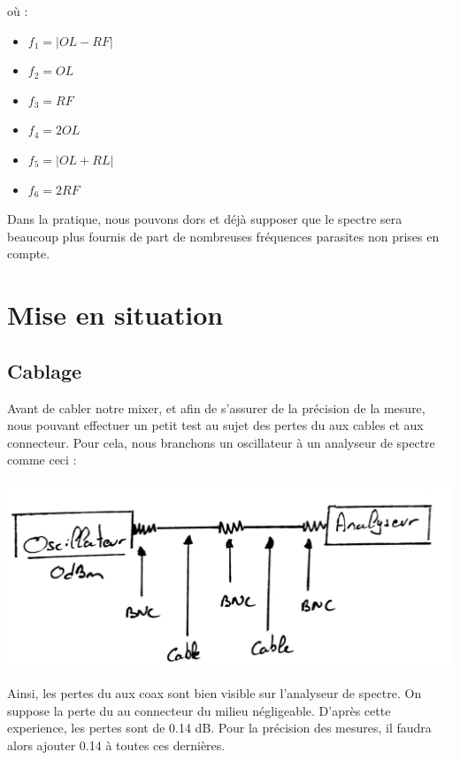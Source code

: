\documentclass[a4paper,12pt]{report}            %
\begin{document}
où : 
\begin{itemize}
    \item $f_{1} = |OL-RF|$
    \item $f_{2} = OL$ 
    \item $f_{3} = RF$
    \item $f_{4} = 2OL$
    \item $f_{5} = |OL+RL|$
    \item $f_{6} = 2RF$
\end{itemize}


\bigskip
Dans la pratique, nous pouvons dors et déjà supposer que le spectre sera beaucoup
plus fournis de part de nombreuses fréquences parasites non prises en compte.

\chapter{Mise en situation}
\section{Cablage}

Avant de cabler notre mixer, et afin de s'assurer de la précision de la mesure, 
nous pouvant effectuer un petit test au sujet des pertes du aux cables et aux connecteur.
Pour cela, nous branchons un oscillateur à un analyseur de spectre comme ceci :\\
\begin{center}\includegraphics[scale = 0.2]{pic/mesure_perte.png}\\ \end{center}

    Ainsi, les pertes du aux coax sont bien visible sur l'analyseur de spectre. On suppose
la perte du au connecteur du milieu négligeable. D'après cette experience, les pertes sont de
0.14 dB. Pour la précision des mesures, il faudra alors ajouter 0.14 à toutes ces dernières.
\end{document}
